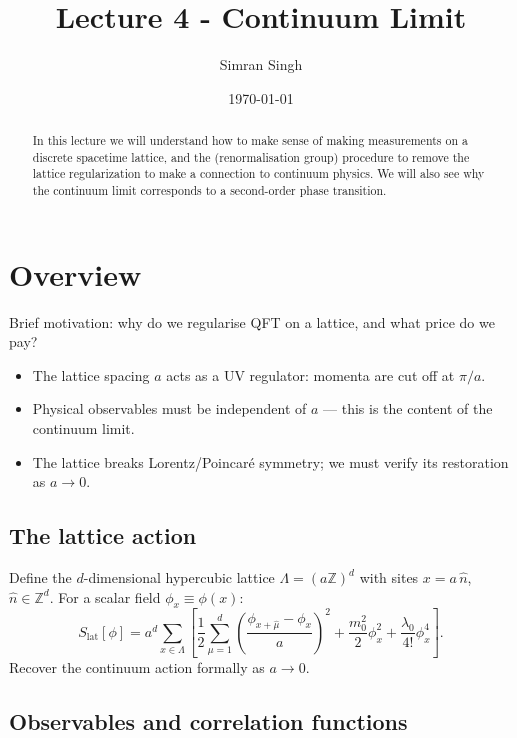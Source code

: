 \documentclass[11pt]{article}
\title{Lecture 4 - Continuum Limit}
\author{Simran Singh}
\date{\today}
\theoremstyle{definition}
\begin{document}
\maketitle

\begin{abstract}
    In this lecture we will understand how to make sense of making measurements on a discrete spacetime lattice, and the (renormalisation group) procedure to remove the lattice regularization to make a connection to continuum physics. We will also see why the continuum limit corresponds to a second-order phase transition.
\end{abstract}

\section{Overview}

Brief motivation: why do we regularise QFT on a lattice, and what price do we pay?

\begin{itemize}
    \item The lattice spacing $a$ acts as a UV regulator: momenta are cut off at $\pi/a$.
    \item Physical observables must be independent of $a$ --- this is the content of the continuum limit.
    \item The lattice breaks Lorentz/Poincaré symmetry; we must verify its restoration as $a\to 0$.
\end{itemize}

\subsection{The lattice action}

Define the $d$-dimensional hypercubic lattice $\Lambda = (a\mathbb{Z})^d$ with sites $x = a\,\hat{n}$,
$\hat{n}\in\mathbb{Z}^d$.  For a scalar field $\phi_x \equiv \phi(x)$:
%
\begin{equation}
    S_{\text{lat}}[\phi] = a^d \sum_{x\in\Lambda} \left[
        \frac{1}{2}\sum_{\mu=1}^{d}\left(\frac{\phi_{x+\hat\mu}-\phi_x}{a}\right)^2
        + \frac{m_0^2}{2}\phi_x^2 + \frac{\lambda_0}{4!}\phi_x^4
    \right].
\end{equation}
%
Recover the continuum action formally as $a\to 0$.

\subsection{Observables and correlation functions}
\end{document}
